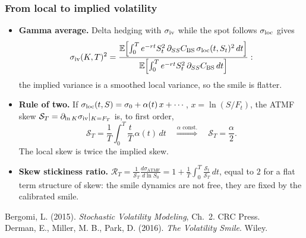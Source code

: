 \begin{frame}
\frametitle{From local to implied volatility}
\begin{scriptsize}
\begin{itemize}
\item \textbf{Gamma average.} Delta hedging with $\sigma_{\mathrm{iv}}$ while the spot follows $\sigma_{\mathrm{loc}}$ gives
\begin{equation*}
    \sigma_{\mathrm{iv}}(K,T)^2
    = \frac{
        \mathbb{E}\!\left[\int_0^T e^{-rt} S_t^2\,
            \partial_{SS} C_{\mathrm{BS}}\,\sigma_{\mathrm{loc}}(t, S_t)^2\,dt\right]
      }{
        \mathbb{E}\!\left[\int_0^T e^{-rt} S_t^2\,
            \partial_{SS} C_{\mathrm{BS}}\,dt\right]
      }:
\end{equation*}
the implied variance is a smoothed local variance, so the smile is flatter.

\item \textbf{Rule of two.} If $\sigma_{\mathrm{loc}}(t, S) = \sigma_0 + \alpha(t)\, x + \cdots$, $x = \ln(S / F_t)$,
the ATMF skew $\mathcal{S}_T = \partial_{\ln K} \sigma_{\mathrm{iv}} |_{K = F_T}$ is, to first order,
\begin{equation*}
    \mathcal{S}_T = \frac{1}{T}\int_0^T \frac{t}{T}\,\alpha(t)\,dt
    \quad \overset{\alpha \text{ const.}}{\Longrightarrow} \quad
    \mathcal{S}_T = \frac{\alpha}{2}.
\end{equation*}
The local skew is twice the implied skew.

\item \textbf{Skew stickiness ratio.}
$\mathcal{R}_T = \frac{1}{\mathcal{S}_T}\frac{d\sigma_{\mathrm{ATMF}}}{d\ln S_0} = 1 + \frac{1}{T}\int_0^T \frac{\mathcal{S}_t}{\mathcal{S}_T}\,dt$,
equal to $2$ for a flat term structure of skew:
the smile dynamics are not free, they are fixed by the calibrated smile.
\end{itemize}
\medskip
Bergomi, L. (2015). \emph{Stochastic Volatility Modeling}, Ch.~2. CRC Press.\\
Derman, E., Miller, M. B., Park, D. (2016). \emph{The Volatility Smile}. Wiley.
\end{scriptsize}
\end{frame}
